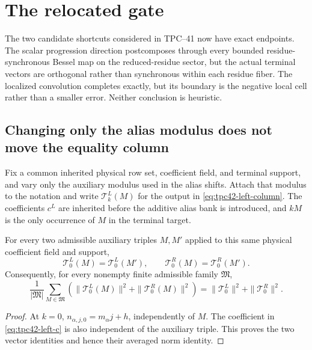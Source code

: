 \section{The relocated gate}
\label{sec:tpc42-next-gate}

The two candidate shortcuts considered in TPC--41 now have exact
endpoints.  The scalar progression direction postcomposes through every
bounded residue-synchronous Bessel map on the reduced-residue sector, but
the actual terminal vectors
are orthogonal rather than synchronous within each residue fiber.  The
localized convolution completes exactly, but its boundary is the
negative local cell rather than a smaller error.  Neither conclusion is
heuristic.

\subsection{Changing only the alias modulus does not move the equality column}

Fix a common inherited physical row set, coefficient field, and terminal
support, and vary only the auxiliary modulus used in the alias shifts.
Attach that modulus to the notation and write
\(\mathscr T_k^L(M)\) for the output in
\eqref{eq:tpc42-left-column}.  The coefficients \(c^L\) are inherited
before the additive alias bank is introduced, and \(kM\) is the only
occurrence of \(M\) in the terminal target.

\begin{proposition}
\label{prop:tpc42-equality-column-invariance}
For every two admissible auxiliary triples \(M,M'\) applied to this same
physical coefficient field and support,
\begin{equation}
 \boxed{
 \mathscr T_0^L(M)=\mathscr T_0^L(M'),
 \qquad
 \mathscr T_0^R(M)=\mathscr T_0^R(M').}
 \label{eq:tpc42-equality-column-invariance}
\end{equation}
Consequently, for every nonempty finite admissible family
\(\mathfrak M\),
\begin{equation}
 \frac1{|\mathfrak M|}\sum_{M\in\mathfrak M}
 \left(
  \|\mathscr T_0^L(M)\|^2+
  \|\mathscr T_0^R(M)\|^2
 \right)
 =\|\mathscr T_0^L\|^2+
  \|\mathscr T_0^R\|^2.
 \label{eq:tpc42-equality-average-invariant}
\end{equation}
\end{proposition}

\begin{proof}
At \(k=0\),
\(n_{\alpha,j,0}=m_\alpha j+h\), independently of \(M\).  The
coefficient in \eqref{eq:tpc42-left-c} is also independent of the
auxiliary triple.  This proves the two vector identities and hence their
averaged norm identity.
\end{proof}

